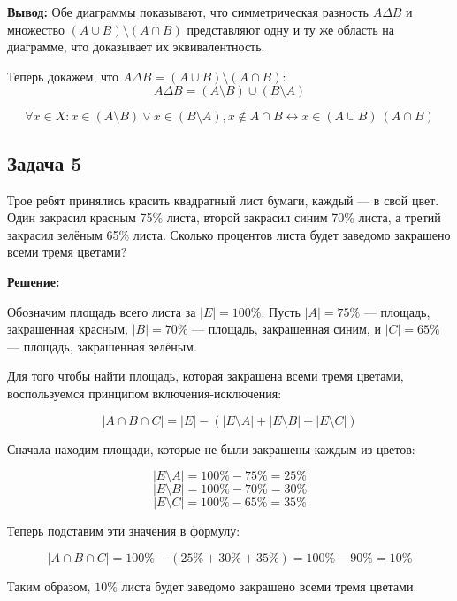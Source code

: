 \documentclass[a4paper,12pt]{article}
\begin{document}
\textbf{Вывод:} Обе диаграммы показывают, что симметрическая разность $A \Delta B$ и множество $(A \cup B) \setminus (A \cap B)$ представляют одну и ту же область на диаграмме, что доказывает их эквивалентность.

Теперь докажем, что $A\Delta B = (A \cup B) \setminus (A \cap B)$:
\[
A\Delta B = (A \setminus B) \cup (B \setminus A)
\]

\[
\forall x \in X: x \in (A \setminus B) \lor x \in (B \setminus A), x \notin A \cap B \leftrightarrow x \in (A\cup B) \ (A\cap B)
\]

\vspace{1cm}

\subsection{Задача 5}

Трое ребят принялись красить квадратный лист бумаги, каждый — в свой цвет. Один закрасил красным 75\% листа, второй закрасил синим 70\% листа, а третий закрасил зелёным 65\% листа. Сколько процентов листа будет заведомо закрашено всеми тремя цветами?

\textbf{Решение:}

Обозначим площадь всего листа за \( |E| = 100\% \). Пусть \( |A| = 75\% \) — площадь, закрашенная красным, \( |B| = 70\% \) — площадь, закрашенная синим, и \( |C| = 65\% \) — площадь, закрашенная зелёным.

Для того чтобы найти площадь, которая закрашена всеми тремя цветами, воспользуемся принципом включения-исключения:

\[
|A \cap B \cap C| = |E| - \left( |E \setminus A| + |E \setminus B| + |E \setminus C| \right)
\]

Сначала находим площади, которые не были закрашены каждым из цветов:

\[
|E \setminus A| = 100\% - 75\% = 25\%
\]
\[
|E \setminus B| = 100\% - 70\% = 30\%
\]
\[
|E \setminus C| = 100\% - 65\% = 35\%
\]

Теперь подставим эти значения в формулу:

\[
|A \cap B \cap C| = 100\% - (25\% + 30\% + 35\%) = 100\% - 90\% = 10\%
\]

Таким образом, \( 10\% \) листа будет заведомо закрашено всеми тремя цветами.
\end{document}
